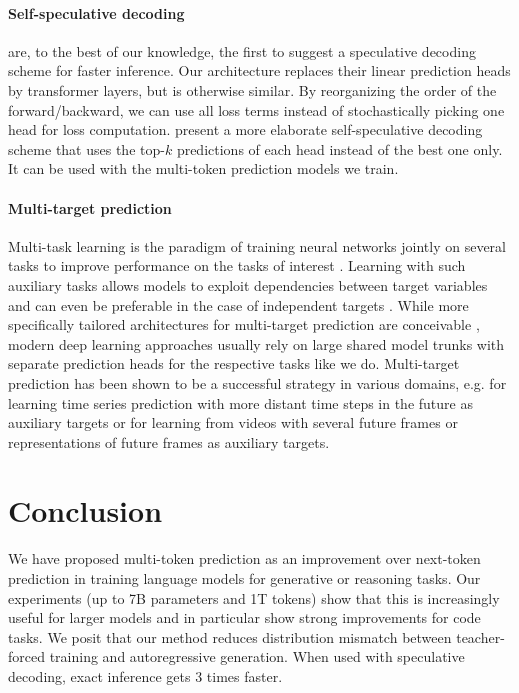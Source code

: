 \documentclass{article}
\theoremstyle{plain}
\theoremstyle{definition}
\theoremstyle{remark}
\begin{document}
\paragraph{Self-speculative decoding}
\citet{stern2018blockwise} are, to the best of our knowledge, the first to suggest a speculative decoding scheme for faster inference. Our architecture replaces their linear prediction heads by transformer layers, but is otherwise similar. By reorganizing the order of the forward/backward, we can use all loss terms instead of stochastically picking one head for loss computation. \citet{cai2024medusa} present a more elaborate self-speculative decoding scheme that uses the top-$k$ predictions of each head instead of the best one only. It can be used with the multi-token prediction models we train.

\paragraph{Multi-target prediction}
Multi-task learning is the paradigm of training neural networks jointly on several tasks to improve performance on the tasks of interest \citep{caruana1997multitask}. Learning with such auxiliary tasks allows models to exploit dependencies between target variables and can even be preferable in the case of independent targets \citep{waegeman2019multi}. While more specifically tailored architectures for multi-target prediction are conceivable \citep{spyromitros2016multi,read2021classifier}, modern deep learning approaches usually rely on large shared model trunks with separate prediction heads for the respective tasks \citep{caruana1997multitask,silver2016mastering,lample2022hypertree} like we do. Multi-target prediction has been shown to be a successful strategy in various domains, e.g. for learning time series prediction with more distant time steps in the future as auxiliary targets \citep{vapnik2009new} or for learning from videos with several future frames \citep{mathieu2016deep,srivastava2016unsupervised} or representations of future frames \citep{vondrick2016anticipating} as auxiliary targets.

\section{Conclusion}
\label{sect:conclusion}

We have proposed multi-token prediction as an improvement over next-token prediction in training language models for generative or reasoning tasks. 
Our experiments (up to 7B parameters and 1T tokens) show that this is increasingly useful for larger models and in particular show strong improvements for code tasks.  
We posit that our method reduces distribution mismatch between teacher-forced training and autoregressive generation. 
When used with speculative decoding, exact inference gets 3 times faster.
\end{document}
